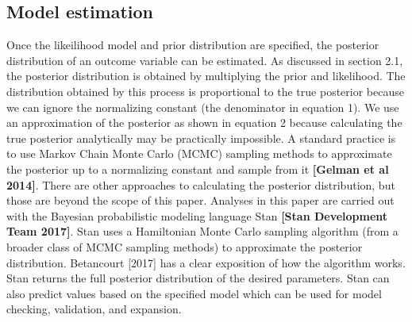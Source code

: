 \documentclass{article}
\begin{document}
\subsection{Model estimation}
Once the likeilihood model and prior distribution are specified, the posterior distribution of an outcome variable can be estimated. As discussed in section 2.1, the posterior distribution is obtained by multiplying the prior and likelihood. The distribution obtained by this process is proportional to the true posterior because we can ignore the normalizing constant (the denominator in equation 1). We use an approximation of the posterior as shown in equation 2 because calculating the true posterior analytically may be practically impossible.  A standard practice is to use Markov Chain Monte Carlo (MCMC) sampling methods to approximate the posterior up to a normalizing constant and sample from it \textbf{[Gelman et al 2014]}. There are  other approaches to calculating the posterior distribution, but those are beyond the scope of this paper. Analyses in this paper are carried out with the Bayesian probabilistic modeling language Stan \textbf{[Stan Development Team 2017]}. Stan uses a Hamiltonian Monte Carlo sampling algorithm (from a broader class of MCMC sampling methods) to approximate the posterior distribution. Betancourt [2017] has a clear exposition of how the algorithm works. Stan returns the full posterior distribution of the desired parameters. Stan can also predict values based on the specified model which can be used for model checking, validation, and expansion.
\end{document}
